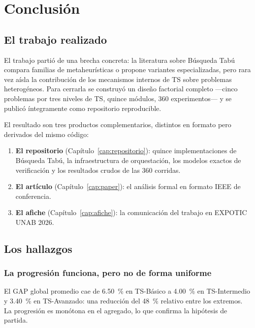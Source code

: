 \chapter{Conclusión}
\label{cap:conclusion}

\section{El trabajo realizado}

El trabajo partió de una brecha concreta: la literatura sobre Búsqueda Tabú
compara familias de metaheurísticas o propone variantes especializadas, pero
rara vez aísla la contribución de los mecanismos internos de TS sobre problemas
heterogéneos. Para cerrarla se construyó un diseño factorial completo —cinco
problemas por tres niveles de TS, quince módulos, 360 experimentos— y se
publicó íntegramente como repositorio reproducible.

El resultado son tres productos complementarios, distintos en formato pero
derivados del mismo código:

\begin{enumerate}
  \item \textbf{El repositorio} (Capítulo~\ref{cap:repositorio}): quince
    implementaciones de Búsqueda Tabú, la infraestructura de orquestación,
    los modelos exactos de verificación y los resultados crudos de las 360
    corridas.
  \item \textbf{El artículo} (Capítulo~\ref{cap:paper}): el análisis formal
    en formato IEEE de conferencia.
  \item \textbf{El afiche} (Capítulo~\ref{cap:afiche}): la comunicación del
    trabajo en EXPOTIC UNAB 2026.
\end{enumerate}

\section{Los hallazgos}

\subsection{La progresión funciona, pero no de forma uniforme}

El GAP global promedio cae de \SI{6.50}{\percent} en TS-Básico a
\SI{4.00}{\percent} en TS-Intermedio y \SI{3.40}{\percent} en TS-Avanzado:
una reducción del \SI{48}{\percent} relativo entre los extremos. La
progresión es monótona en el agregado, lo que confirma la hipótesis de
partida.

